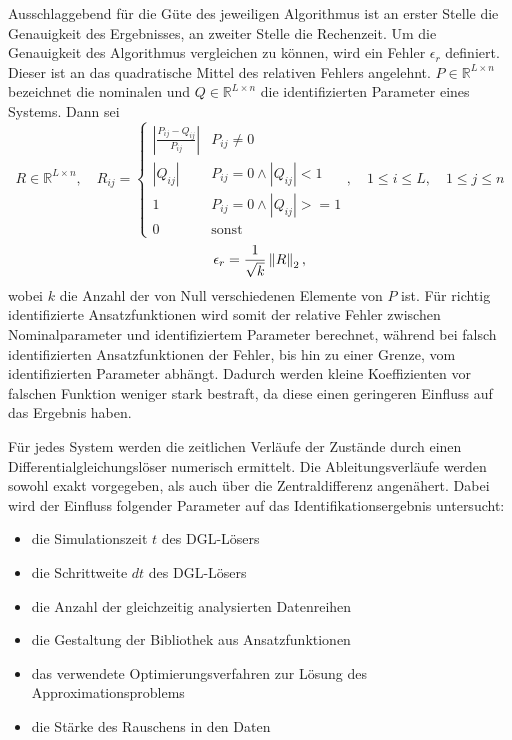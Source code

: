Ausschlaggebend für die Güte des jeweiligen Algorithmus ist an erster Stelle die Genauigkeit des Ergebnisses, an zweiter Stelle die Rechenzeit. Um die Genauigkeit des Algorithmus vergleichen zu können, wird ein Fehler $\epsilon_r$  definiert. Dieser ist an das quadratische Mittel des relativen Fehlers angelehnt. $P\in\mathbb{R}^{L\times n}$ bezeichnet die nominalen und $Q\in\mathbb{R}^{L\times n}$ die identifizierten Parameter eines Systems. Dann sei
\begin{equation}
R \in\mathbb{R}^{L\times n} , \quad R_{ij}= \begin{cases}
|\frac{P_{ij}-Q_{ij}}{P_{ij}}| & P_{ij} \neq 0\\
|Q_{ij}| & P_{ij} = 0 \wedge |Q_{ij}| < 1\\
1 & P_{ij} = 0 \wedge |Q_{ij}| >= 1\\
0 & \text{sonst}
\end{cases}, \quad  1 \leq i \leq L, \quad 1\leq j \leq n
\end{equation}
\begin{equation}
\epsilon_r = \frac{1}{\sqrt{k}}\left\|R\right\|_2,
\end{equation} 
wobei $k$ die Anzahl der von Null verschiedenen Elemente von $P$ ist. Für richtig identifizierte Ansatzfunktionen wird somit der relative Fehler zwischen Nominalparameter und identifiziertem Parameter berechnet, während bei falsch identifizierten Ansatzfunktionen der Fehler, bis hin zu einer Grenze, vom identifizierten Parameter abhängt. Dadurch werden kleine Koeffizienten vor falschen Funktion weniger stark bestraft, da diese einen geringeren Einfluss auf das Ergebnis haben. 

Für jedes System werden die zeitlichen Verläufe der Zustände durch einen Differentialgleichungslöser numerisch %
ermittelt. Die Ableitungsverläufe werden sowohl exakt vorgegeben, als auch über die Zentraldifferenz angenähert. Dabei wird der Einfluss folgender Parameter auf das Identifikationsergebnis untersucht:
\begin{itemize}
\item die Simulationszeit $t$ des DGL-Lösers
\item die Schrittweite $dt$ des DGL-Lösers
\item die Anzahl der gleichzeitig analysierten Datenreihen 
\item die Gestaltung der Bibliothek aus Ansatzfunktionen
\item das verwendete Optimierungsverfahren zur Lösung des Approximationsproblems
\item die Stärke des Rauschens in den Daten
\end{itemize}




